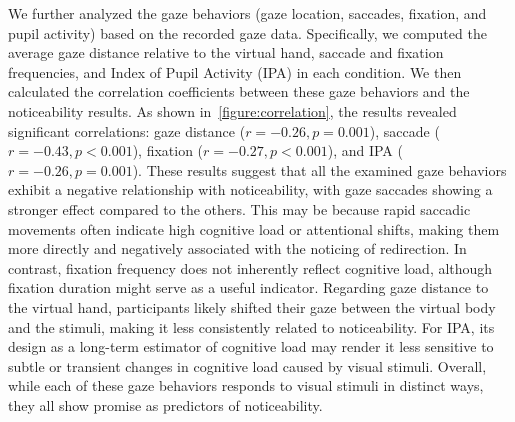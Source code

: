 We further analyzed the gaze behaviors (gaze location, saccades, fixation, and pupil activity) based on the recorded gaze data. 
Specifically, we computed the average gaze distance relative to the virtual hand, saccade and fixation frequencies, and Index of Pupil Activity (IPA) in each condition. 
We then calculated the correlation coefficients between these gaze behaviors and the noticeability results.
As shown in~\autoref{figure:correlation}, the results revealed significant correlations: gaze distance ($r = -0.26, p = 0.001$), saccade ($r = -0.43, p < 0.001$), fixation ($r = -0.27, p < 0.001$), and IPA ($r = -0.26, p = 0.001$). 
These results suggest that all the examined gaze behaviors exhibit a negative relationship with noticeability, with gaze saccades showing a stronger effect compared to the others. 
This may be because rapid saccadic movements often indicate high cognitive load or attentional shifts, making them more directly and negatively associated with the noticing of redirection. 
In contrast, fixation frequency does not inherently reflect cognitive load, although fixation duration might serve as a useful indicator.
Regarding gaze distance to the virtual hand, participants likely shifted their gaze between the virtual body and the stimuli, making it less consistently related to noticeability. 
For IPA, its design as a long-term estimator of cognitive load may render it less sensitive to subtle or transient changes in cognitive load caused by visual stimuli.
Overall, while each of these gaze behaviors responds to visual stimuli in distinct ways, they all show promise as predictors of noticeability.



